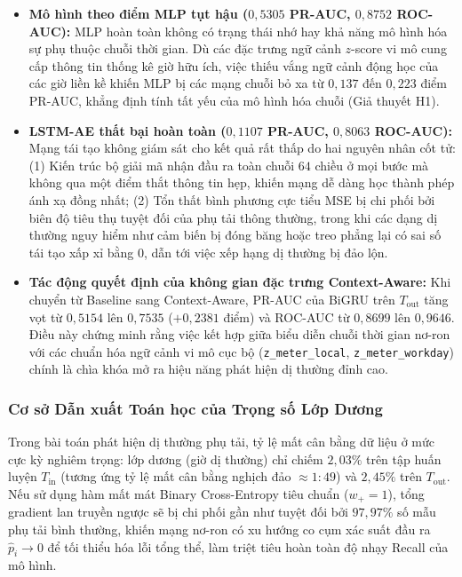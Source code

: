 \begin{itemize}
    \item \textbf{Mô hình theo điểm MLP tụt hậu ($0{,}5305$ PR-AUC, $0{,}8752$ ROC-AUC):} MLP hoàn toàn không có trạng thái nhớ hay khả năng mô hình hóa sự phụ thuộc chuỗi thời gian. Dù các đặc trưng ngữ cảnh $z$-score vi mô cung cấp thông tin thống kê giờ hữu ích, việc thiếu vắng ngữ cảnh động học của các giờ liền kề khiến MLP bị các mạng chuỗi bỏ xa từ $0{,}137$ đến $0{,}223$ điểm PR-AUC, khẳng định tính tất yếu của mô hình hóa chuỗi (Giả thuyết H1).
    \item \textbf{LSTM-AE thất bại hoàn toàn ($0{,}1107$ PR-AUC, $0{,}8063$ ROC-AUC):} Mạng tái tạo không giám sát cho kết quả rất thấp do hai nguyên nhân cốt tử: (1) Kiến trúc bộ giải mã nhận đầu ra toàn chuỗi $64$ chiều ở mọi bước mà không qua một điểm thắt thông tin hẹp, khiến mạng dễ dàng học thành phép ánh xạ đồng nhất; (2) Tổn thất bình phương cực tiểu MSE bị chi phối bởi biên độ tiêu thụ tuyệt đối của phụ tải thông thường, trong khi các dạng dị thường nguy hiểm như cảm biến bị đóng băng hoặc treo phẳng lại có sai số tái tạo xấp xỉ bằng $0$, dẫn tới việc xếp hạng dị thường bị đảo lộn.
    \item \textbf{Tác động quyết định của không gian đặc trưng Context-Aware:} Khi chuyển từ Baseline sang Context-Aware, PR-AUC của BiGRU trên $T_{\text{out}}$ tăng vọt từ $0{,}5154$ lên $0{,}7535$ ($+0{,}2381$ điểm) và ROC-AUC từ $0{,}8699$ lên $0{,}9646$. Điều này chứng minh rằng việc kết hợp giữa biểu diễn chuỗi thời gian nơ-ron với các chuẩn hóa ngữ cảnh vi mô cục bộ (\texttt{z\_meter\_local}, \texttt{z\_meter\_workday}) chính là chìa khóa mở ra hiệu năng phát hiện dị thường đỉnh cao.
\end{itemize}

\subsubsection{Cơ sở Dẫn xuất Toán học của Trọng số Lớp Dương}

Trong bài toán phát hiện dị thường phụ tải, tỷ lệ mất cân bằng dữ liệu ở mức cực kỳ nghiêm trọng: lớp dương (giờ dị thường) chỉ chiếm $2{,}03\%$ trên tập huấn luyện $T_{\text{in}}$ (tương ứng tỷ lệ mất cân bằng nghịch đảo $\approx 1:49$) và $2{,}45\%$ trên $T_{\text{out}}$. Nếu sử dụng hàm mất mát Binary Cross-Entropy tiêu chuẩn ($w_{+} = 1$), tổng gradient lan truyền ngược sẽ bị chi phối gần như tuyệt đối bởi $97{,}97\%$ số mẫu phụ tải bình thường, khiến mạng nơ-ron có xu hướng co cụm xác suất đầu ra $\hat{p}_i \rightarrow 0$ để tối thiểu hóa lỗi tổng thể, làm triệt tiêu hoàn toàn độ nhạy Recall của mô hình.

